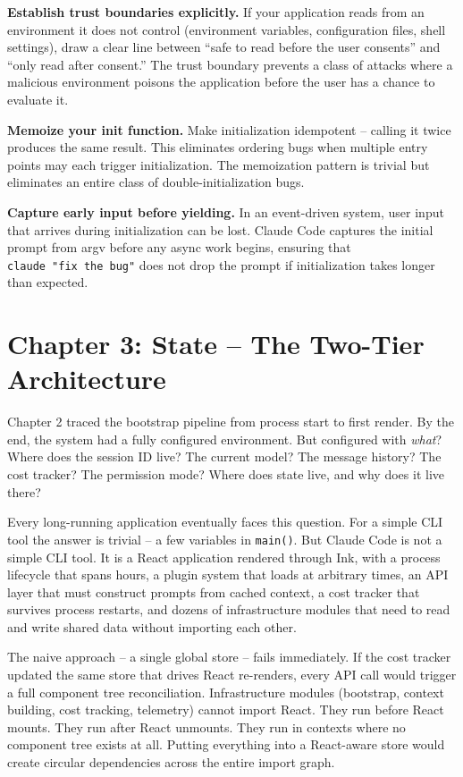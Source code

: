 \documentclass[
  english,
  11pt,
  letterpaper,
]{book}
\begin{document}
\textbf{Establish trust boundaries explicitly.} If your application
reads from an environment it does not control (environment variables,
configuration files, shell settings), draw a clear line between ``safe
to read before the user consents'' and ``only read after consent.'' The
trust boundary prevents a class of attacks where a malicious environment
poisons the application before the user has a chance to evaluate it.

\textbf{Memoize your init function.} Make initialization idempotent --
calling it twice produces the same result. This eliminates ordering bugs
when multiple entry points may each trigger initialization. The
memoization pattern is trivial but eliminates an entire class of
double-initialization bugs.

\textbf{Capture early input before yielding.} In an event-driven system,
user input that arrives during initialization can be lost. Claude Code
captures the initial prompt from argv before any async work begins,
ensuring that \texttt{claude\ "fix\ the\ bug"} does not drop the prompt
if initialization takes longer than expected.

\chapter{Chapter 3: State -- The Two-Tier
Architecture}\label{chapter-3-state-the-two-tier-architecture}

Chapter 2 traced the bootstrap pipeline from process start to first
render. By the end, the system had a fully configured environment. But
configured with \emph{what}? Where does the session ID live? The current
model? The message history? The cost tracker? The permission mode? Where
does state live, and why does it live there?

Every long-running application eventually faces this question. For a
simple CLI tool the answer is trivial -- a few variables in
\texttt{main()}. But Claude Code is not a simple CLI tool. It is a React
application rendered through Ink, with a process lifecycle that spans
hours, a plugin system that loads at arbitrary times, an API layer that
must construct prompts from cached context, a cost tracker that survives
process restarts, and dozens of infrastructure modules that need to read
and write shared data without importing each other.

The naive approach -- a single global store -- fails immediately. If the
cost tracker updated the same store that drives React re-renders, every
API call would trigger a full component tree reconciliation.
Infrastructure modules (bootstrap, context building, cost tracking,
telemetry) cannot import React. They run before React mounts. They run
after React unmounts. They run in contexts where no component tree
exists at all. Putting everything into a React-aware store would create
circular dependencies across the entire import graph.
\end{document}
